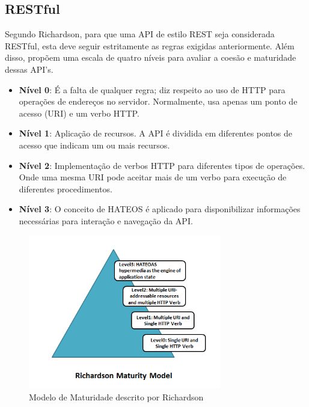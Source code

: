 \subsection[RESTful]{RESTful}

Segundo Richardson, para que uma API de estilo REST seja considerada RESTful, esta deve seguir estritamente as regras exigidas anteriormente. Além disso, propõem uma escala de quatro níveis para avaliar a coesão e maturidade dessas API's. \cite{RichardsonEtAl2013}

\begin{itemize}[noitemsep]
\item \textbf{Nível 0}: É a falta de qualquer regra; diz respeito ao uso de HTTP para operações de endereços no servidor. Normalmente, usa apenas um ponto de acesso (URI) e um verbo HTTP.
\item \textbf{Nível 1}: Aplicação de recursos. A API é dividida em diferentes pontos de acesso que indicam um ou mais recursos.
\item \textbf{Nível 2}: Implementação de verbos HTTP para diferentes tipos de operações. Onde uma mesma URI pode aceitar mais de um verbo para execução de diferentes procedimentos.
\item \textbf{Nível 3}: O conceito de HATEOS é aplicado para disponibilizar informações necessárias para interação e navegação da API.
\end{itemize}

\begin{figure}[H]
  \centering
  \includegraphics[width=0.75\textwidth,height=\textheight,keepaspectratio]{figuras/richardson-maturity-model.png}
  \caption{Modelo de Maturidade descrito por Richardson}
\end{figure}
